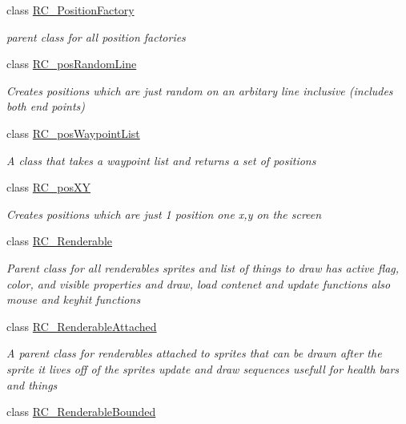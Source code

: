 \begin{DoxyCompactItemize}
class \mbox{\hyperlink{class_r_c___framework_1_1_r_c___position_factory}{R\+C\+\_\+\+Position\+Factory}}
\begin{DoxyCompactList}\small\item\em parent class for all position factories \end{DoxyCompactList}\item 
class \mbox{\hyperlink{class_r_c___framework_1_1_r_c__pos_random_line}{R\+C\+\_\+pos\+Random\+Line}}
\begin{DoxyCompactList}\small\item\em Creates positions which are just random on an arbitary line inclusive (includes both end points) \end{DoxyCompactList}\item 
class \mbox{\hyperlink{class_r_c___framework_1_1_r_c__pos_waypoint_list}{R\+C\+\_\+pos\+Waypoint\+List}}
\begin{DoxyCompactList}\small\item\em A class that takes a waypoint list and returns a set of positions \end{DoxyCompactList}\item 
class \mbox{\hyperlink{class_r_c___framework_1_1_r_c__pos_x_y}{R\+C\+\_\+pos\+XY}}
\begin{DoxyCompactList}\small\item\em Creates positions which are just 1 position one x,y on the screen \end{DoxyCompactList}\item 
class \mbox{\hyperlink{class_r_c___framework_1_1_r_c___renderable}{R\+C\+\_\+\+Renderable}}
\begin{DoxyCompactList}\small\item\em Parent class for all renderables sprites and list of things to draw has active flag, color, and visible properties and draw, load contenet and update functions also mouse and keyhit functions \end{DoxyCompactList}\item 
class \mbox{\hyperlink{class_r_c___framework_1_1_r_c___renderable_attached}{R\+C\+\_\+\+Renderable\+Attached}}
\begin{DoxyCompactList}\small\item\em A parent class for renderables attached to sprites that can be drawn after the sprite it lives off of the sprites update and draw sequences usefull for health bars and things \end{DoxyCompactList}\item 
class \mbox{\hyperlink{class_r_c___framework_1_1_r_c___renderable_bounded}{R\+C\+\_\+\+Renderable\+Bounded}}

\end{DoxyCompactItemize}
